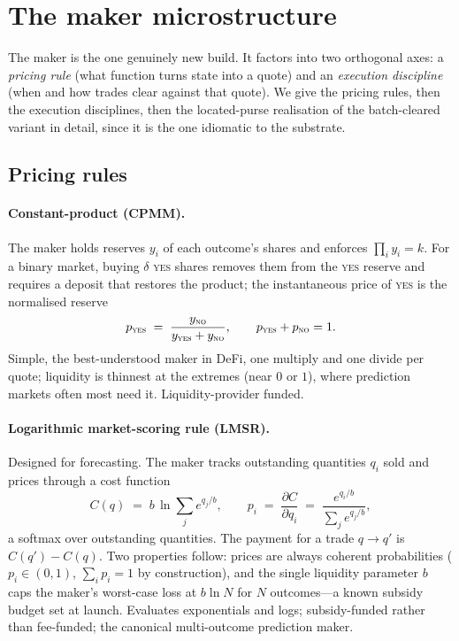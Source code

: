 \documentclass[11pt]{article}
\begin{document}
\section{The maker microstructure}\label{sec:maker}

The maker is the one genuinely new build. It factors into two orthogonal axes: a
\emph{pricing rule} (what function turns state into a quote) and an \emph{execution
discipline} (when and how trades clear against that quote). We give the pricing rules, then the
execution disciplines, then the located-purse realisation of the batch-cleared variant in
detail, since it is the one idiomatic to the substrate.

\subsection{Pricing rules}

\paragraph{Constant-product (CPMM).} The maker holds reserves $y_i$ of each outcome's shares
and enforces $\prod_i y_i = k$. For a binary market, buying $\delta$ \textsc{yes} shares
removes them from the \textsc{yes} reserve and requires a deposit that restores the product;
the instantaneous price of \textsc{yes} is the normalised reserve
\[
p_{\textsc{yes}} \;=\; \frac{y_{\textsc{no}}}{y_{\textsc{yes}} + y_{\textsc{no}}},
\qquad p_{\textsc{yes}} + p_{\textsc{no}} = 1.
\]
Simple, the best-understood maker in DeFi, one multiply and one divide per quote; liquidity is
thinnest at the extremes (near $0$ or $1$), where prediction markets often most need it.
Liquidity-provider funded.

\paragraph{Logarithmic market-scoring rule (LMSR).} Designed for forecasting. The maker tracks
outstanding quantities $q_i$ sold and prices through a cost function
\[
C(q) \;=\; b \,\ln \!\sum_j e^{q_j / b},
\qquad
p_i \;=\; \frac{\partial C}{\partial q_i} \;=\; \frac{e^{q_i/b}}{\sum_j e^{q_j/b}},
\]
a softmax over outstanding quantities. The payment for a trade $q \to q'$ is $C(q') - C(q)$.
Two properties follow: prices are always coherent probabilities ($p_i \in (0,1)$, $\sum_i p_i
= 1$ by construction), and the single liquidity parameter $b$ caps the maker's worst-case loss
at $b\ln N$ for $N$ outcomes---a known subsidy budget set at launch. Evaluates exponentials and
logs; subsidy-funded rather than fee-funded; the canonical multi-outcome prediction maker.
\end{document}
